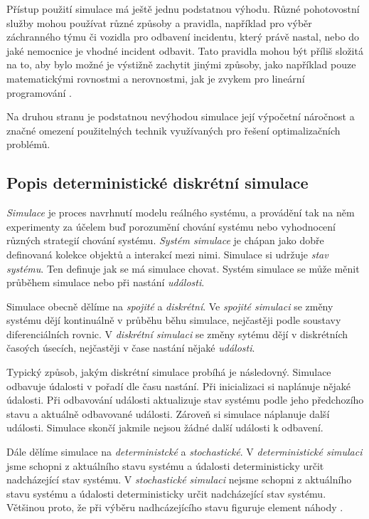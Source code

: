 Přístup použití simulace má ještě jednu podstatnou výhodu.
Různé pohotovostní služby mohou používat různé způsoby a pravidla, například pro výběr záchranného týmu či vozidla pro odbavení incidentu, který právě nastal,
nebo do jaké nemocnice je vhodné incident odbavit.
Tato pravidla mohou být příliš složitá na to, aby bylo možné je výstižně zachytit jinými způsoby, jako například pouze matematickými rovnostmi a nerovnostmi, jak je zvykem pro lineární programování \cite{LP}.

Na druhou stranu je podstatnou nevýhodou simulace její výpočetní náročnost a značné omezení použitelných technik využívaných pro řešení optimalizačních problémů.

\subsection{Popis deterministické diskrétní simulace}

\textit{Simulace} je proces navrhnutí modelu reálného systému, a provádění tak na něm experimenty za účelem buď porozumění chování systému
nebo vyhodnocení různých strategií chování systému.
\textit{Systém simulace} je chápan jako dobře definovaná kolekce objektů a interakcí mezi nimi.
Simulace si udržuje \textit{stav systému}. Ten definuje jak se má simulace chovat.
Systém simulace se může měnit průběhem simulace nebo při nastání \textit{události}.

Simulace obecně dělíme na \textit{spojité} a \textit{diskrétní}.
Ve \textit{spojité simulaci} se změny systému dějí kontinuálně v průběhu běhu simulace, nejčastěji podle soustavy diferenciálních rovnic.
V \textit{diskrétní simulaci} se změny sytému dějí v diskrétních časoých úsecích, nejčastěji v čase nastání nějaké \textit{události}.

Typický způsob, jakým diskrétní simulace probíhá je následovný.
Simulace odbavuje údalosti v pořadí dle času nastání.
Při inicializaci si naplánuje nějaké údalosti.
Při odbavování události aktualizuje stav systému podle jeho předchozího stavu a aktuálně odbavované události. Zároveň si simulace náplanuje další události. 
Simulace skončí jakmile nejsou žádné další události k odbavení.

Dále dělíme simulace na \textit{deterministcké} a \textit{stochastické}.
V \textit{deterministické simulaci} jsme schopni z aktuálního stavu systému a údalosti deterministicky určit nadcházející stav systému.
V \textit{stochastické simulaci} nejsme schopni z aktuálního stavu systému a údalosti deterministicky určit nadcházející stav systému.
Většinou proto, že při výběru nadhcázejícího stavu figuruje element náhody
\cite{SimulaceBook}.

